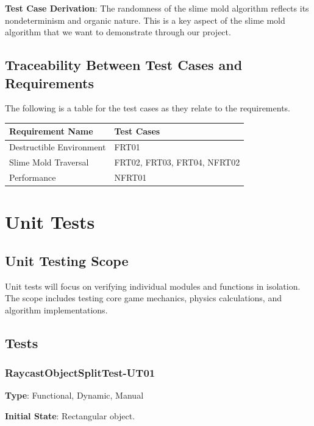 \documentclass[12pt, titlepage]{article}
\begin{document}
\textbf{Test Case Derivation}: The randomness of the slime mold algorithm
reflects its nondeterminism and organic nature. This is a key aspect of the
slime mold algorithm that we want to demonstrate through our project.


\subsection{Traceability Between Test Cases and Requirements}

The following is a table for the test cases as they relate to the requirements.

\begin{table}[H]
\begin{tabular}{|l|l|}
\hline
\textbf{Requirement Name} & \textbf{Test Cases}  \\ \hline
Destructible Environment  & FRT01        \\ \hline
Slime Mold Traversal      & FRT02, FRT03, FRT04, NFRT02        \\ \hline
Performance               & NFRT01 \\ \hline
\end{tabular}%

\end{table}

\section{Unit Tests}\label{unittests}

\subsection{Unit Testing Scope}

Unit tests will focus on verifying individual modules and functions in isolation.
The scope includes testing core game mechanics, physics calculations,
and algorithm implementations.

\subsection{Tests}

\subsubsection{RaycastObjectSplitTest-UT01}

\textbf{Type}: Functional, Dynamic, Manual

\textbf{Initial State}: Rectangular object.
\end{document}
